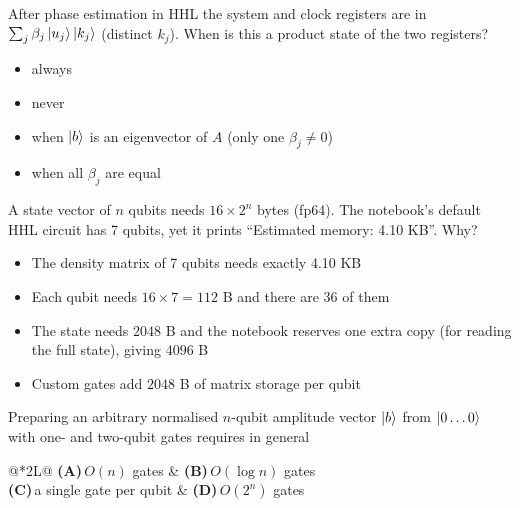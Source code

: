 \documentclass[11pt,a4paper]{article}
\newcommand{\optlabel}[1]{\textbf{(#1)}}
\newenvironment{qitem}[1]{\begin{list}{}{\setlength{\leftmargin}{3.3em}\setlength{\labelwidth}{3.1em}%
  \setlength{\labelsep}{0.2em}\setlength{\topsep}{3pt}\setlength{\parsep}{3pt}}\item[\textbf{Q.#1}\hfill]}{\end{list}}
\newcommand{\qsep}{\par\vspace{2pt}{\color{black!15}\hrule}\vspace{4pt}}
\begin{document}
\begin{qitem}{32}
After phase estimation in HHL the system and clock registers are in $\sum_j\beta_j\ket{u_j}\ket{k_j}$ (distinct $k_j$). When is this a product state of the two registers?
\begin{itemize}[leftmargin=2.6em, labelsep=0.4em, itemsep=2pt, topsep=3pt]
\item[\optlabel{A}] always
\item[\optlabel{B}] never
\item[\optlabel{C}] when $\ket b$ is an eigenvector of $A$ (only one $\beta_j \ne 0$)
\item[\optlabel{D}] when all $\beta_j$ are equal
\end{itemize}
\end{qitem}
\qsep

\begin{qitem}{33}
A state vector of $n$ qubits needs $16\times2^n$ bytes (fp64). The notebook's default HHL circuit has 7 qubits, yet it prints ``Estimated memory: 4.10 KB''. Why?
\begin{itemize}[leftmargin=2.6em, labelsep=0.4em, itemsep=2pt, topsep=3pt]
\item[\optlabel{A}] The density matrix of 7 qubits needs exactly 4.10 KB
\item[\optlabel{B}] Each qubit needs $16 \times 7 = 112$ B and there are 36 of them
\item[\optlabel{C}] The state needs $2048$ B and the notebook reserves one extra copy (for reading the full state), giving $4096$ B
\item[\optlabel{D}] Custom gates add $2048$ B of matrix storage per qubit
\end{itemize}
\end{qitem}
\qsep

\begin{qitem}{34}
Preparing an arbitrary normalised $n$-qubit amplitude vector $\ket b$ from $\ket{0\dots0}$ with one- and two-qubit gates requires in general
\par\smallskip\noindent\begin{tabularx}{\linewidth}{@{}*{2}{L}@{}}
\optlabel{A}\,$O(n)$ gates & \optlabel{B}\,$O(\log n)$ gates \\[3pt]
\optlabel{C}\,a single gate per qubit & \optlabel{D}\,$O(2^n)$ gates
\end{tabularx}
\end{qitem}
\qsep
\end{document}
